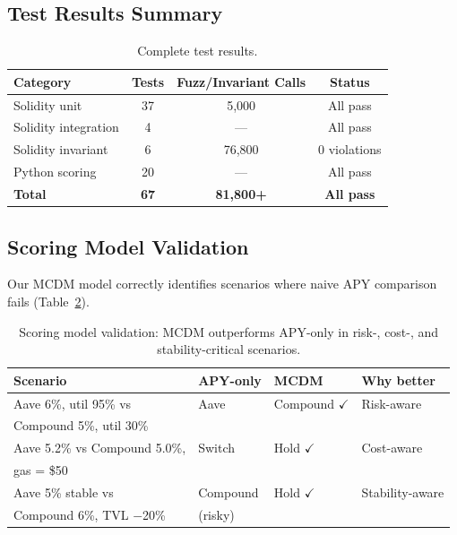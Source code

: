 \documentclass[12pt]{article}
\begin{document}
\subsection{Test Results Summary}

\begin{table}[H]
\centering
\caption{Complete test results.}
\label{tab:results}
\small
\begin{tabular}{@{}lccc@{}}
\toprule
\textbf{Category} & \textbf{Tests} & \textbf{Fuzz/Invariant Calls} & \textbf{Status} \\
\midrule
Solidity unit        & 37 & 5{,}000    & All pass \\
Solidity integration & 4  & ---        & All pass \\
Solidity invariant   & 6  & 76{,}800   & 0 violations \\
Python scoring       & 20 & ---        & All pass \\
\midrule
\textbf{Total}       & \textbf{67} & \textbf{81{,}800+} & \textbf{All pass} \\
\bottomrule
\end{tabular}
\end{table}

\subsection{Scoring Model Validation}

Our MCDM model correctly identifies scenarios where naive APY comparison fails (Table~\ref{tab:scoring-validation}).

\begin{table}[H]
\centering
\caption{Scoring model validation: MCDM outperforms APY-only in risk-, cost-, and stability-critical scenarios.}
\label{tab:scoring-validation}
\small
\begin{tabular}{@{}llll@{}}
\toprule
\textbf{Scenario} & \textbf{APY-only} & \textbf{MCDM} & \textbf{Why better} \\
\midrule
Aave 6\%, util 95\% vs     & Aave  & Compound $\checkmark$ & Risk-aware \\
\quad Compound 5\%, util 30\% &       &                       & \\
Aave 5.2\% vs Compound 5.0\%, & Switch & Hold $\checkmark$   & Cost-aware \\
\quad gas = \$50               &        &                      & \\
Aave 5\% stable vs             & Compound & Hold $\checkmark$ & Stability-aware \\
\quad Compound 6\%, TVL $-$20\% & (risky)  &                  & \\
\bottomrule
\end{tabular}
\end{table}
\end{document}
